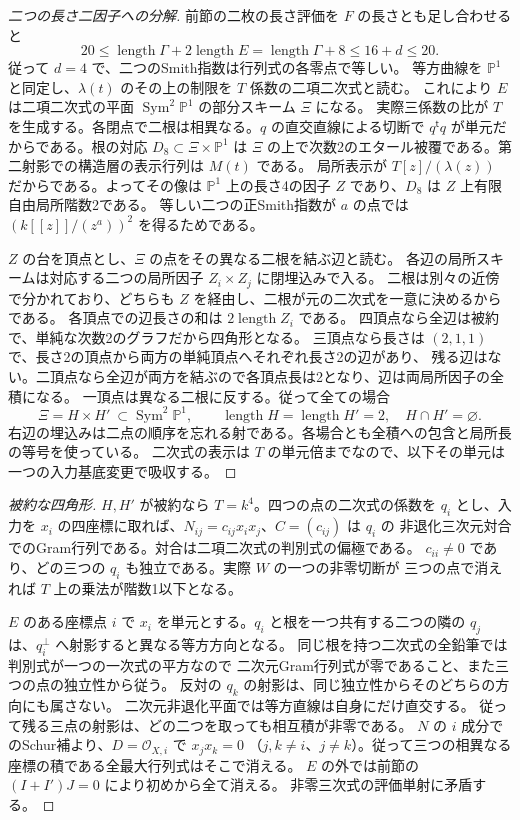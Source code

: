\begin{proof}[二つの長さ二因子への分解]
前節の二枚の長さ評価を $F$ の長さとも足し合わせると
\[
  20\le\operatorname{length}\Gamma+2\operatorname{length}E
       =\operatorname{length}\Gamma+8
       \le16+d\le20 .
\]
従って $d=4$ で、二つのSmith指数は行列式の各零点で等しい。
等方曲線を $\mathbb P^1$ と同定し、$\lambda(t)$ のその上の制限を $T$ 係数の二項二次式と読む。
これにより $E$ は二項二次式の平面 $\operatorname{Sym}^2\mathbb P^1$ の部分スキーム $\Xi$ になる。
実際三係数の比が $T$ を生成する。各閉点で二根は相異なる。$q$ の直交直線による切断で
$q^{\mathsf t}q$ が単元だからである。根の対応 $D_8\subset\Xi\times\mathbb P^1$ は
$\Xi$ の上で次数2のエタール被覆である。第二射影での構造層の表示行列は $M(t)$ である。
局所表示が $T[z]/(\lambda(z))$ だからである。よってその像は
$\mathbb P^1$ 上の長さ4の因子 $Z$ であり、$D_8$ は $Z$ 上有限自由局所階数2である。
等しい二つの正Smith指数が $a$ の点では $(k[[z]]/(z^a))^2$ を得るためである。

$Z$ の台を頂点とし、$\Xi$ の点をその異なる二根を結ぶ辺と読む。
各辺の局所スキームは対応する二つの局所因子 $Z_i\times Z_j$ に閉埋込みで入る。
二根は別々の近傍で分かれており、どちらも $Z$ を経由し、二根が元の二次式を一意に決めるからである。
各頂点での辺長さの和は $2\operatorname{length} Z_i$ である。
四頂点なら全辺は被約で、単純な次数2のグラフだから四角形となる。
三頂点なら長さは $(2,1,1)$ で、長さ2の頂点から両方の単純頂点へそれぞれ長さ2の辺があり、
残る辺はない。二頂点なら全辺が両方を結ぶので各頂点長は2となり、辺は両局所因子の全積になる。
一頂点は異なる二根に反する。従って全ての場合
\[
       \Xi=H\times H'\ \subset\operatorname{Sym}^2\mathbb P^1,
       \qquad \operatorname{length}H=\operatorname{length}H'=2,\quad H\cap H'=\varnothing .
\]
右辺の埋込みは二点の順序を忘れる射である。各場合とも全積への包含と局所長の等号を使っている。
二次式の表示は $T$ の単元倍までなので、以下その単元は一つの入力基底変更で吸収する。
\end{proof}

\begin{proof}[被約な四角形]
$H,H'$ が被約なら $T=k^4$。四つの点の二次式の係数を $q_i$ とし、入力を
$x_i$ の四座標に取れば、$N_{ij}=c_{ij}x_i x_j$、$C=(c_{ij})$ は $q_i$ の
非退化三次元対合でのGram行列である。対合は二項二次式の判別式の偏極である。
$c_{ii}\ne0$ であり、どの三つの $q_i$ も独立である。実際 $W$ の一つの非零切断が
三つの点で消えれば $T$ 上の乗法が階数1以下となる。

$E$ のある座標点 $i$ で $x_i$ を単元とする。$q_i$ と根を一つ共有する二つの隣の
$q_j$ は、$q_i^\perp$ へ射影すると異なる等方方向となる。
同じ根を持つ二次式の全鉛筆では判別式が一つの一次式の平方なので
二次元Gram行列式が零であること、また三つの点の独立性から従う。
反対の $q_k$ の射影は、同じ独立性からそのどちらの方向にも属さない。
二次元非退化平面では等方直線は自身にだけ直交する。
従って残る三点の射影は、どの二つを取っても相互積が非零である。
$N$ の $i$ 成分でのSchur補より、$D=\mathcal O_{X,i}$ で $x_jx_k=0$
（$j,k\ne i$、$j\ne k$）。従って三つの相異なる座標の積である全最大行列式はそこで消える。
$E$ の外では前節の $(I+I')J=0$ により初めから全て消える。
非零三次式の評価単射に矛盾する。
\end{proof}

